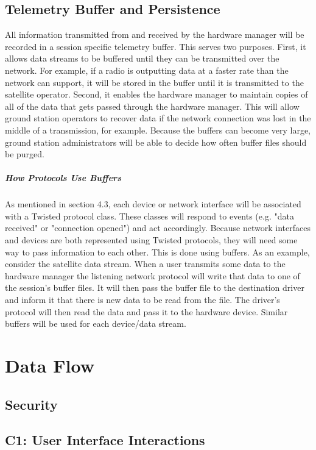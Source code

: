 \documentclass{mxl-design}
\begin{document}
\subsection{Telemetry Buffer and Persistence}
All information transmitted from and received by the hardware manager will be recorded in a session specific telemetry buffer. This serves two purposes. First, it allows data streams to be buffered until they can be transmitted over the network. For example, if a radio is outputting data at a faster rate than the network can support, it will be stored in the buffer until it is transmitted to the satellite operator. Second, it enables the hardware manager to maintain copies of all of the data that gets passed through the hardware manager. This will allow ground station operators to recover data if the network connection was lost in the middle of a transmission, for example. Because the buffers can become very large, ground station administrators will be able to decide how often buffer files should be purged.

\subparagraph{How Protocols Use Buffers}
As mentioned in section 4.3, each device or network interface will be associated with a Twisted protocol class. These classes will respond to events (e.g. "data received" or "connection opened") and act accordingly. Because network interfaces and devices are both represented using Twisted protocols, they will need some way to pass information to each other. This is done using buffers. As an example, consider the satellite data stream. When a user transmits some data to the hardware manager the listening network protocol will write that data to one of the session's buffer files. It will then pass the buffer file to the destination driver and inform it that there is new data to be read from the file. The driver's protocol will then read the data and pass it to the hardware device. Similar buffers will be used for each device/data stream.

\section{Data Flow}

\subsection{Security}

\subsection{C1: User Interface Interactions}
\end{document}
